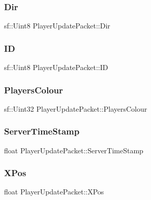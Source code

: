 \subsubsection{\texorpdfstring{Dir}{Dir}}
{\footnotesize\ttfamily sf\+::\+Uint8 Player\+Update\+Packet\+::\+Dir}

\hypertarget{struct_player_update_packet_ad89ec5382255970ef4c072c39162cf81}{}\label{struct_player_update_packet_ad89ec5382255970ef4c072c39162cf81} 
\subsubsection{\texorpdfstring{ID}{ID}}
{\footnotesize\ttfamily sf\+::\+Uint8 Player\+Update\+Packet\+::\+ID}

\hypertarget{struct_player_update_packet_a1fff66955a58ace71c581e906d2cb501}{}\label{struct_player_update_packet_a1fff66955a58ace71c581e906d2cb501} 
\subsubsection{\texorpdfstring{Players\+Colour}{PlayersColour}}
{\footnotesize\ttfamily sf\+::\+Uint32 Player\+Update\+Packet\+::\+Players\+Colour}

\hypertarget{struct_player_update_packet_ab6cfba614a9285162fa733ee3e058664}{}\label{struct_player_update_packet_ab6cfba614a9285162fa733ee3e058664} 
\subsubsection{\texorpdfstring{Server\+Time\+Stamp}{ServerTimeStamp}}
{\footnotesize\ttfamily float Player\+Update\+Packet\+::\+Server\+Time\+Stamp}

\hypertarget{struct_player_update_packet_ad656b9b8f778c5271075196bb684c16a}{}\label{struct_player_update_packet_ad656b9b8f778c5271075196bb684c16a} 
\subsubsection{\texorpdfstring{X\+Pos}{XPos}}
{\footnotesize\ttfamily float Player\+Update\+Packet\+::\+X\+Pos}

